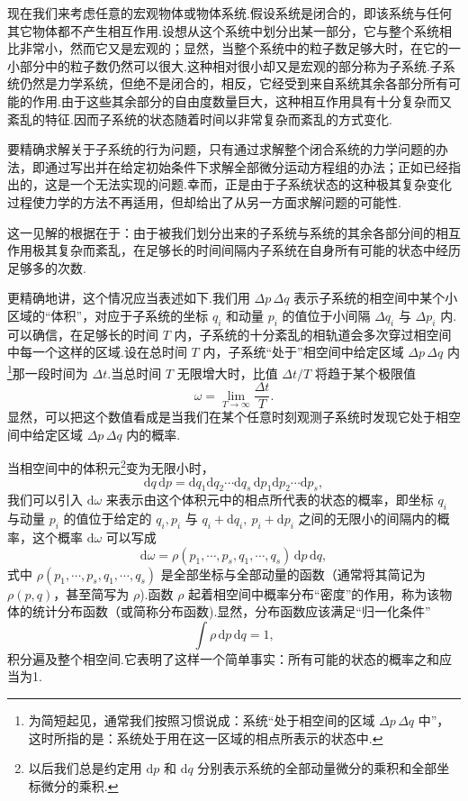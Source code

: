 现在我们来考虑任意的宏观物体或物体系统.假设系统是闭合的，即该系统与任何其它物体都不产生相互作用.设想从这个系统中划分出某一部分，它与整个系统相比非常小，然而它又是宏观的；显然，当整个系统中的粒子数足够大时，在它的一小部分中的粒子数仍然可以很大.这种相对很小却又是宏观的部分称为子系统.子系统仍然是力学系统，但绝不是闭合的，相反，它经受到来自系统其余各部分所有可能的作用.由于这些其余部分的自由度数量巨大，这种相互作用具有十分复杂而又紊乱的特征.因而子系统的状态随着时间以非常复杂而紊乱的方式变化.

要精确求解关于子系统的行为问题，只有通过求解整个闭合系统的力学问题的办法，即通过写出并在给定初始条件下求解全部微分运动方程组的办法；正如已经指出的，这是一个无法实现的问题.幸而，正是由于子系统状态的这种极其复杂变化过程使力学的方法不再适用，但却给出了从另一方面求解问题的可能性.

这一见解的根据在于：由于被我们划分出来的子系统与系统的其余各部分间的相互作用极其复杂而紊乱，在足够长的时间间隔内子系统在自身所有可能的状态中经历足够多的次数.

更精确地讲，这个情况应当表述如下.我们用 $\Delta p\,\Delta q$ 表示子系统的相空间中某个小区域的“体积”，对应于子系统的坐标 $q_i$ 和动量 $p_i$ 的值位于小间隔 $\Delta q_i$ 与 $\Delta p_i$ 内.可以确信，在足够长的时间 $T$ 内，子系统的十分紊乱的相轨道会多次穿过相空间中每一个这样的区域.设在总时间 $T$ 内，子系统“处于”相空间中给定区域 $\Delta p\,\Delta q$ 内\footnote{为简短起见，通常我们按照习惯说成：系统“处于相空间的区域 $\Delta p\,\Delta q$ 中”，这时所指的是：系统处于用在这一区域的相点所表示的状态中.}那一段时间为 $\Delta t$.当总时间 $T$ 无限增大时，比值 $\Delta t/T$ 将趋于某个极限值
\begin{equation}
  \omega=\lim_{T\to\infty}\frac{\Delta t}{T}.
\end{equation}
显然，可以把这个数值看成是当我们在某个任意时刻观测子系统时发现它处于相空间中给定区域 $\Delta p\,\Delta q$ 内的概率.

当相空间中的体积元\footnote{以后我们总是约定用 $\mathrm{d}p$ 和 $\mathrm{d}q$ 分别表示系统的全部动量微分的乘积和全部坐标微分的乘积.}变为无限小时，
\begin{equation}
  \mathrm{d}q\,\mathrm{d}p=\mathrm{d}q_1\mathrm{d}q_2\cdots\mathrm{d}q_s\,\mathrm{d}p_1\mathrm{d}p_2\cdots\mathrm{d}p_s,
\end{equation}
我们可以引入 $\mathrm{d}\omega$ 来表示由这个体积元中的相点所代表的状态的概率，即坐标 $q_i$ 与动量 $p_i$ 的值位于给定的 $q_i,p_i$ 与 $q_i+\mathrm{d}q_i,\ p_i+\mathrm{d}p_i$ 之间的无限小的间隔内的概率，这个概率 $\mathrm{d}\omega$ 可以写成
\begin{equation}
  \mathrm{d}\omega=\rho(p_1,\cdots,p_s,q_1,\cdots,q_s)\,\mathrm{d}p\,\mathrm{d}q,
\end{equation}
式中 $\rho(p_1,\cdots,p_s,q_1,\cdots,q_s)$ 是全部坐标与全部动量的函数（通常将其简记为 $\rho(p,q)$，甚至简写为 $\rho$).函数 $\rho$ 起着相空间中概率分布“密度”的作用，称为该物体的统计分布函数（或简称分布函数).显然，分布函数应该满足“归一化条件”
\begin{equation}
  \int\rho\,\mathrm{d}p\,\mathrm{d}q=1,
\end{equation}
积分遍及整个相空间.它表明了这样一个简单事实：所有可能的状态的概率之和应当为1.

